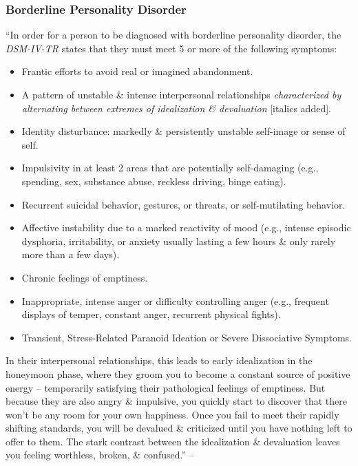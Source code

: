 \documentclass{article}
\numberwithin{equation}{section}
\begin{document}
\subsubsection{Borderline Personality Disorder}
``In order for a person to be diagnosed with borderline personality disorder, the \textit{DSM-IV-TR} states that they must meet 5 or more of the following symptoms:
\begin{itemize}
	\item Frantic efforts to avoid real or imagined abandonment.
	\item A pattern of unstable \& intense interpersonal relationships \textit{characterized by alternating between extremes of idealization \& devaluation} [italics added].
	\item Identity disturbance: markedly \& persistently unstable self-image or sense of self.
	\item Impulsivity in at least 2 areas that are potentially self-damaging (e.g., spending, sex, substance abuse, reckless driving, binge eating).
	\item Recurrent suicidal behavior, gestures, or threats, or self-mutilating behavior.
	\item Affective instability due to a marked reactivity of mood (e.g., intense episodic dysphoria, irritability, or anxiety usually lasting a few hours \& only rarely more than a few days).
	\item Chronic feelings of emptiness.
	\item Inappropriate, intense anger or difficulty controlling anger (e.g., frequent displays of temper, constant anger, recurrent physical fights).
	\item Transient, Stress-Related Paranoid Ideation or Severe Dissociative Symptoms.
\end{itemize}
In their interpersonal relationships, this leads to early idealization in the honeymoon phase, where they groom you to become a constant source of positive energy -- temporarily satisfying their pathological feelings of emptiness. But because they are also angry \& impulsive, you quickly start to discover that there won't be any room for your own happiness. Once you fail to meet their rapidly shifting standards, you will be devalued \& criticized until you have nothing left to offer to them. The stark contrast between the idealization \& devaluation leaves you feeling worthless, broken, \& confused.'' -- \cite[pp. 194--195]{MacKenzie2015}
\end{document}
